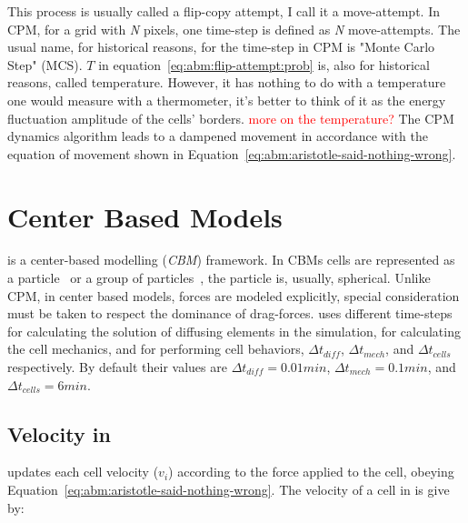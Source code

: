 This process is usually called a flip-copy attempt, I call it a move-attempt. In CPM, for a grid with \textit{N} pixels, one time-step is defined as \textit{N} move-attempts. The usual name, for historical reasons, for the time-step in CPM is "Monte Carlo Step" (MCS). $T$ in equation~\ref{eq:abm:flip-attempt:prob} is, also for historical reasons, called temperature. However, it has nothing to do with a temperature one would measure with a thermometer, it's better to think of it as the energy fluctuation amplitude of the cells' borders. \textcolor{red}{more on the temperature?}
The CPM dynamics algorithm leads to a dampened movement in accordance with the equation of movement shown in Equation~\ref{eq:abm:aristotle-said-nothing-wrong}. 

\section{Center Based Models}\label{sec:abm:center}


\pscs is a center-based modelling (\textit{CBM}) framework. In CBMs cells are represented as a particle~\cite{van_liedekerke_simulating_2015} or a group of particles~\cite{teixeira_single_2021}, the particle is, usually, spherical. Unlike CPM, in center based models, forces are modeled explicitly, special consideration must be taken to respect the dominance of drag-forces. \pscs uses different time-steps for calculating the solution of diffusing elements in the simulation, for calculating the cell mechanics, and for performing cell behaviors, $\Delta t_{diff}$, $\Delta t_{mech}$, and $\Delta t_{cells}$ respectively. By default their values are $\Delta t_{diff} = 0.01 min$, $\Delta t_{mech} = 0.1 min$, and $\Delta t_{cells} = 6 min$.


\subsection{Velocity in \psc}
\psc updates each cell velocity ($v_i$) according to the force applied to the cell, obeying Equation~\ref{eq:abm:aristotle-said-nothing-wrong}. The velocity of a cell in \pscs is give by:

